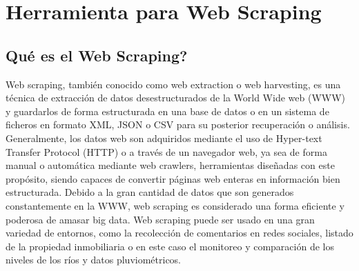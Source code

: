 \section{Herramienta para Web Scraping}

\subsection{Qué es el Web Scraping?}
Web scraping, también conocido como web extraction o web harvesting, es una técnica de extracción de datos desestructurados de la World Wide web (WWW) y guardarlos de forma estructurada en una base de datos o en un sistema de ficheros en formato XML, JSON o CSV para su posterior recuperación o análisis. Generalmente, los datos web son adquiridos mediante el uso de Hyper-text Transfer Protocol (HTTP) o a través de un navegador web, ya sea de forma manual o automática mediante web crawlers, herramientas diseñadas con este propósito, siendo capaces de convertir páginas web enteras en información bien estructurada. \cite{zhao2017web} \cite{krotov2018legality}
\newline
\newline
Debido a la gran cantidad de datos que son generados constantemente en la WWW, web scraping es considerado una forma eficiente y poderosa de amasar big data.
\newline
\newline
Web scraping puede ser usado en una gran variedad de entornos, como la recolección de comentarios en redes sociales, listado de la propiedad inmobiliaria o en este caso el monitoreo y comparación de los niveles de los ríos y datos pluviométricos.

